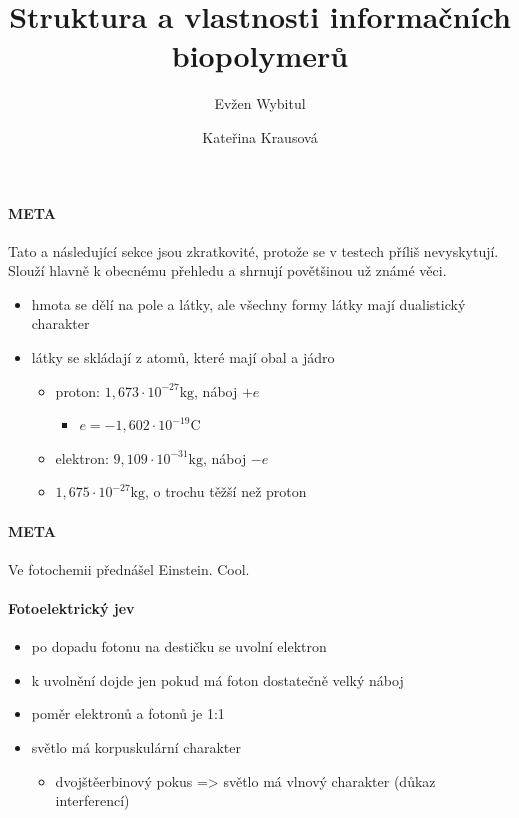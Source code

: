 \documentclass[DIV=8]{scrreprt}
\title{Struktura a vlastnosti informačních biopolymerů}
\author{Evžen Wybitul \and Kateřina Krausová}
\newcommand{\mybox}[2]{
    \paragraph{#1} #2
}
\begin{document}
\begin{titlepage}
\maketitle
\end{titlepage}
\tableofcontents


\mybox{META}{Tato a následující sekce jsou zkratkovité, protože se v testech příliš nevyskytují. Slouží hlavně k obecnému přehledu a shrnují povětšinou už známé věci.}


\begin{itemize}[nosep]
    \item hmota se dělí na pole a látky, ale všechny formy látky mají dualistický charakter
    \item látky se skládají z atomů, které mají obal a jádro
\begin{itemize}[nosep]
    \item proton: \(1,673 \cdot 10^{-27} \text{kg}\), náboj \(+e\)
\begin{itemize}[nosep]
    \item \(e = -1,602 \cdot 10^{-19} \text{C}\)
\end{itemize}

    \item elektron: \(9,109 \cdot 10^{-31} \text{kg}\), náboj \(-e\)
    \item \(1,675 \cdot 10^{-27} \text{kg}\), o trochu těžší než proton
\end{itemize}

\end{itemize}



\mybox{META}{Ve fotochemii přednášel Einstein. Cool.}


\paragraph{Fotoelektrický jev}
\begin{itemize}[nosep]
    \item po dopadu fotonu na destičku se uvolní elektron
    \item k uvolnění dojde jen pokud má foton dostatečně velký náboj
    \item poměr elektronů a fotonů je 1:1
    \item světlo má korpuskulární charakter
\begin{itemize}[nosep]
    \item dvojštěerbinový pokus => světlo má vlnový charakter (důkaz interferencí)
\end{itemize}

\end{itemize}
\end{document}
